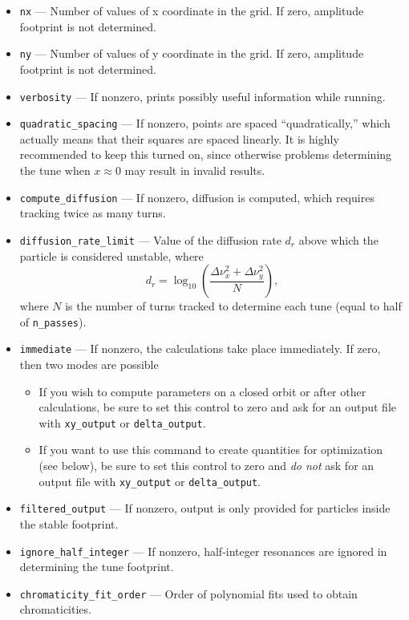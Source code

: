 \documentclass[11pt]{article}
\begin{document}
\begin{itemize}
  Increase the tracking time by a factor of two.
\item \verb|nx| --- Number of values of x coordinate in the grid. If zero, amplitude footprint is not determined.
\item \verb|ny| --- Number of values of y coordinate in the grid. If zero, amplitude footprint is not determined.
\item \verb|verbosity| --- If nonzero, prints possibly useful information while running.
\item \verb|quadratic_spacing| --- If nonzero, points are spaced ``quadratically,'' which actually means that
  their squares are spaced linearly. It is highly recommended to keep this turned on, since otherwise problems determining the
  tune when $x \approx 0$ may result in invalid results.
\item \verb|compute_diffusion| --- If nonzero, diffusion is computed, which requires tracking twice as many turns.
\item \verb|diffusion_rate_limit| --- Value of the diffusion rate $d_r$ above which the particle is considered unstable,
where
\begin{equation}
  d_r = \log_{10} \left(\frac{\Delta\nu_x^2 + \Delta\nu_y^2}{N}\right),
\end{equation}
where $N$ is the number of turns tracked to determine each tune (equal to half of \verb|n_passes|).
\item \verb|immediate| --- If nonzero, the calculations take place immediately. If zero, then two modes are possible
  \begin{itemize}
    \item If you wish to compute parameters on a closed orbit or after other calculations, be sure to set this control to zero
      and ask for an output file with \verb|xy_output| or \verb|delta_output|.
    \item If you want to use this command to create quantities for optimization (see below), be sure to set this control to zero
      and {\em do not} ask for an output file with \verb|xy_output| or \verb|delta_output|.
  \end{itemize}
\item \verb|filtered_output| --- If nonzero, output is only provided for particles inside the stable footprint.
\item \verb|ignore_half_integer| --- If nonzero, half-integer resonances are ignored in determining the tune footprint.
\item \verb|chromaticity_fit_order| --- Order of polynomial fits used to obtain chromaticities.
\end{itemize}
\end{document}
